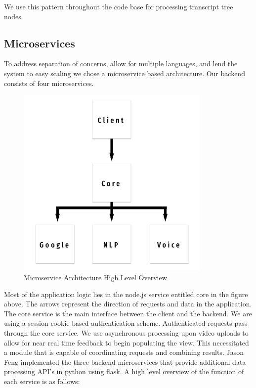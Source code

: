 We use this pattern throughout the code base for processing transcript tree nodes.

\subsection*{Microservices}

To address separation of concerns, allow for multiple languages, and lend the
system to easy scaling we chose a microservice based architecture. Our backend
consists of four microservices. 
 
 
\begin{figure}[H]
  \centering
   \includegraphics[height=3.7in]{figures/microservices}
   \caption{Microservice Architecture High Level Overview}
\end{figure}

Most of the application logic lies in the node.js service entitled core in the
figure above. The arrows represent the direction of requests and data in the
application. The core service is the main interface between the client and the
backend. We are using a session cookie based authentication scheme.
Authenticated requests pass through the core service. We use  asynchronous
processing upon video uploads to allow for near real time feedback to begin
populating the view. This necessitated a module that is capable of coordinating
requests and combining results. Jason Feng implemented the three backend
microservices that provide additional data processing API’s in python using
flask. A high level overview of the function of each service is as follows:


